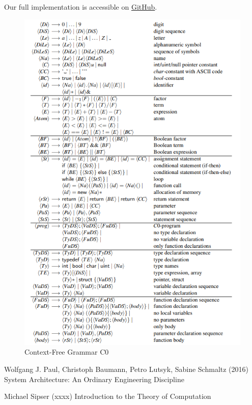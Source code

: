 \documentclass[11pt]{report}
\begin{document}
    Our full implementation is accessible on \href{https://github.com/fyfsb/dcfg.git}{GitHub}.

    \begin{figure}[h!]
        \center
        \includegraphics[width=13cm]{C0.png}
        \caption{Context-Free Grammar C0}
        \label{fig:grammar_c0}
    \end{figure}

    \tableofcontents
    
    

    \begin{thebibliography}{9}
        Wolfgang J. Paul, Christoph Baumann, Petro Lutsyk, Sabine Schmaltz (2016) System Architecture: An Ordinary Engineering Discipline

        Michael Sipser (xxxx) Introduction to the Theory of Computation
    \end{thebibliography}
\end{document}

